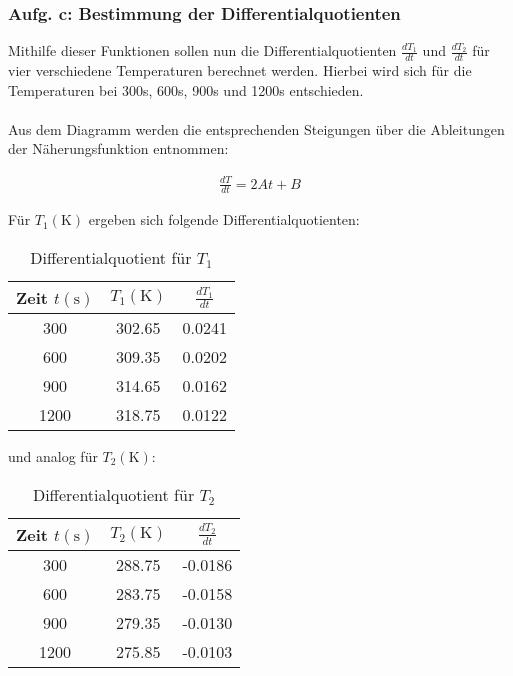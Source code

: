 \newpage

\subsubsection{Aufg. c: Bestimmung der Differentialquotienten} \label{sec:aufg_c}

Mithilfe dieser Funktionen sollen nun die Differentialquotienten $\frac{dT_{1}}{dt}$ und $\frac{dT_{2}}{dt}$ 
für vier verschiedene Temperaturen berechnet werden. Hierbei wird sich für die Temperaturen bei 
300s, 600s, 900s und 1200s entschieden. 
\\\\
Aus dem Diagramm werden die entsprechenden Steigungen über die Ableitungen der Näherungsfunktion entnommen:

\begin{align*} 
  \frac{dT}{dt} = 2At + B 
\end{align*}

Für $T_{1} (\unit{\kelvin})$ ergeben sich folgende Differentialquotienten:

\begin{table}
  \centering
  \caption{Differentialquotient für $T_{1}$}
  \label{tab:berechnete_werte_T1}
  \begin{tabular}{c c c}
    \toprule
    {Zeit $t (\unit{\second})$} &
    {$T_{1} (\unit{\kelvin})$} &
    {$\frac{dT_{1}}{dt}$} \\
    \midrule
     300 & 302.65 &  0.0241 \\
     600 & 309.35 &  0.0202 \\
     900 & 314.65 &  0.0162 \\
    1200 & 318.75 &  0.0122 \\
    \bottomrule
  \end{tabular}
\end{table}

und analog für $T_{2} (\unit{\kelvin})$:

\begin{table}
  \centering
  \caption{Differentialquotient für $T_{2}$}
  \label{tab:berechnete_werte_T2}
  \begin{tabular}{c c c}
    \toprule
    {Zeit $t (\unit{\second})$} &
    {$T_{2} (\unit{\kelvin})$} &
    {$\frac{dT_{2}}{dt}$} \\
    \midrule
     300 & 288.75 & -0.0186 \\
     600 & 283.75 & -0.0158 \\
     900 & 279.35 & -0.0130 \\
    1200 & 275.85 & -0.0103 \\
    \bottomrule
  \end{tabular}
\end{table}

